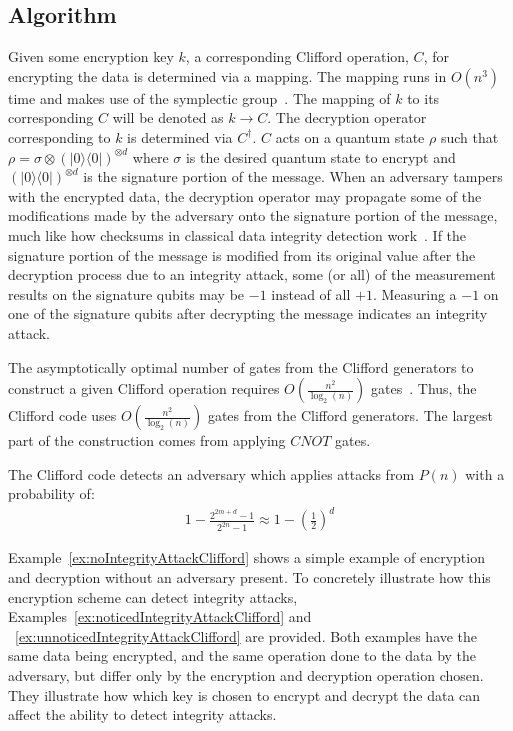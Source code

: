 \subsection{Algorithm}
Given some encryption key $k$, a corresponding Clifford operation, $C$, for encrypting the data is determined via a mapping. The mapping runs in $O \left(n^3 \right)$ time and makes use of the symplectic group~\cite{Koenig2014}. The mapping of $k$ to its corresponding $C$ will be denoted as $k \rightarrow C$. The decryption operator corresponding to $k$ is determined via $C^{\dagger}$. $C$ acts on a quantum state $\rho$ such that $\rho = \sigma \otimes (|0\rangle \langle0|)^{\otimes d}$ where $\sigma$ is the desired quantum state to encrypt and $(|0\rangle \langle0|)^{\otimes d}$ is the signature portion of the message. When an adversary tampers with the encrypted data, the decryption operator may propagate some of the modifications made by the adversary onto the signature portion of the message, much like how checksums in classical data integrity detection work~\cite{checksumWikipedia}. If the signature portion of the message is modified from its original value after the decryption process due to an integrity attack, some (or all) of the measurement results on the signature qubits may be $-1$ instead of all $+1$. Measuring a $-1$ on one of the signature qubits after decrypting the message indicates an integrity attack.

The asymptotically optimal number of gates from the Clifford generators to construct a given Clifford operation requires $O\left(\frac{n^2}{\log_2 (n)} \right)$ gates~\cite{bravyi2021hadamard,patel2008optimal}. Thus, the Clifford code uses $O \left(\frac{n^2}{\log_2(n)} \right)$ gates from the Clifford generators. The largest part of the construction comes from applying $\mathit{CNOT}$ gates.

The Clifford code detects an adversary which applies attacks from $P(n)$ with a probability of:
\begin{align}
1-\frac{2^{2 m+d}-1}{2^{2 n}-1} \approx 1-\left(\frac{1}{2}\right)^{d} \label{eq:CliffordCodeProbabilityOfDetection}
\end{align}

Example~\ref{ex:noIntegrityAttackClifford} shows a simple example of encryption and decryption without an adversary present. To concretely illustrate how this encryption scheme can detect integrity attacks, Examples~\ref{ex:noticedIntegrityAttackClifford} and ~\ref{ex:unnoticedIntegrityAttackClifford} are provided. Both examples have the same data being encrypted, and the same operation done to the data by the adversary, but differ only by the encryption and decryption operation chosen. They illustrate how which key is chosen to encrypt and decrypt the data can affect the ability to detect integrity attacks.

